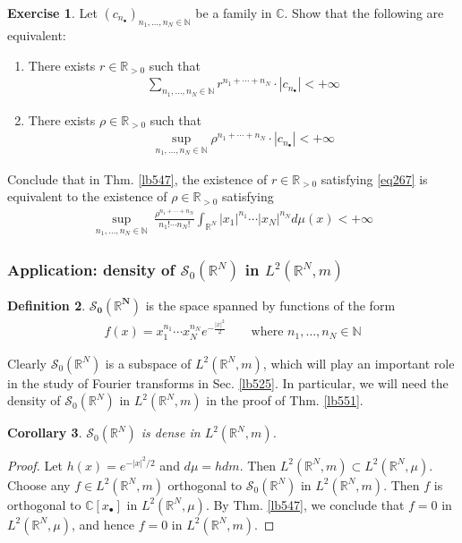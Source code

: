 \documentclass[12pt,b5paper,notitlepage]{article}
\theoremstyle{definition}
\newtheorem{df}{Definition}[subsection]
\newtheorem{exe}[df]{Exercise}
\theoremstyle{plain}
\newtheorem{co}[df]{Corollary}
\newcommand{\blt}{\bullet}
\newcommand{\Cbb}{\mathbb C}
\newcommand{\Nbb}{\mathbb N}
\newcommand{\Rbb}{\mathbb R}
\newcommand{\MS}{\mathcal S}
\numberwithin{equation}{section}
\begin{document}
\begin{exe}
Let $(c_{n_\blt})_{n_1,\dots,n_N\in\Nbb}$ be a family in $\Cbb$. Show that the following are equivalent:
\begin{enumerate}[label=(\arabic*)]
\item There exists $r\in\Rbb_{>0}$ such that
\begin{align*}
\sum_{n_1,\dots,n_N\in\Nbb}r^{n_1+\cdots+n_N}\cdot |c_{n_\blt}|<+\infty
\end{align*}
\item There exists $\rho\in\Rbb_{>0}$ such that
\begin{align*}
\sup_{n_1,\dots,n_N\in\Nbb}\rho^{n_1+\cdots+n_N}\cdot |c_{n_\blt}|<+\infty
\end{align*}
\end{enumerate}
Conclude that in Thm. \ref{lb547}, the existence of $r\in\Rbb_{>0}$ satisfying \eqref{eq267} is equivalent to the existence of $\rho\in\Rbb_{>0}$ satisfying
\begin{align}
\sup_{n_1,\dots,n_N\in\Nbb}~\frac{\rho^{n_1+\cdots+n_N}}{n_1!\cdots n_N!}\int_{\Rbb^N}|x_1|^{n_1}\cdots|x_N|^{n_N}d\mu(x)<+\infty
\end{align}
\end{exe}


\subsubsection{Application: density of $\MS_0(\Rbb^N)$ in $L^2(\Rbb^N,m)$}



\begin{df}\label{lb549}
$\pmb{\MS_0(\Rbb^N)}$ \index{S0@$\MS_0(\Rbb^N)$} is the space spanned by functions of the form
\begin{align}\label{eq262}
f(x)=x_1^{n_1}\cdots x_N^{n_N}e^{-\frac{|x|^2}2}\qquad\text{where }n_1,\dots,n_N\in\Nbb
\end{align}
\end{df}


Clearly $\MS_0(\Rbb^N)$ is a subspace of $L^2(\Rbb^N,m)$, which will play an important role in the study of Fourier transforms in Sec. \ref{lb525}. In particular, we will need the density of $\MS_0(\Rbb^N)$ in $L^2(\Rbb^N,m)$ in the proof of Thm. \ref{lb551}.

\begin{co}\label{lb550}
$\MS_0(\Rbb^N)$ is dense in $L^2(\Rbb^N,m)$.
\end{co}


\begin{proof}
Let $h(x)=e^{-|x|^2/2}$ and $d\mu=hdm$. Then $L^2(\Rbb^N,m)\subset L^2(\Rbb^N,\mu)$. Choose any $f\in L^2(\Rbb^N,m)$ orthogonal to $\MS_0(\Rbb^N)$ in $L^2(\Rbb^N,m)$. Then $f$ is orthogonal to $\Cbb[x_\blt]$ in $L^2(\Rbb^N,\mu)$. By Thm. \ref{lb547}, we conclude that $f=0$ in $L^2(\Rbb^N,\mu)$, and hence $f=0$ in $L^2(\Rbb^N,m)$.
\end{proof}
\end{document}
